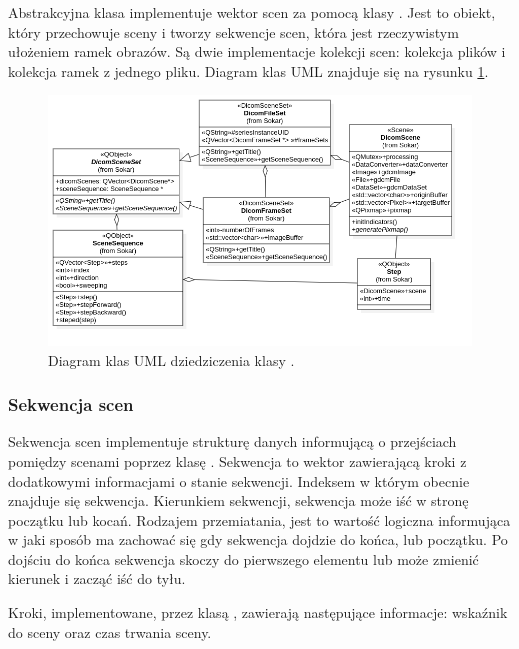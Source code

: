 \label{sec:sokar-scenesets}

Abstrakcyjna klasa  implementuje wektor scen za pomocą klasy .
Jest to obiekt, który przechowuje sceny i tworzy sekwencje scen, która jest rzeczywistym ułożeniem ramek obrazów.
Są dwie implementacje kolekcji scen: kolekcja plików i kolekcja ramek z jednego pliku.
Diagram klas UML znajduje się na rysunku \ref{uml:sokar-scene-sets}.

\begin{figure}[!htbp]
    \centering
    \includegraphics[width=\textwidth]{img/uml/sokar-scene-sets.png}
    \caption{Diagram klas UML dziedziczenia klasy .}
    \label{uml:sokar-scene-sets}
\end{figure}

\subsubsection{Sekwencja scen}
\label{sec:sokar-scenesequence}

\par
Sekwencja scen implementuje strukturę danych informującą o przejściach pomiędzy scenami poprzez klasę .
Sekwencja to wektor zawierającą kroki z dodatkowymi informacjami o stanie sekwencji.
Indeksem w którym obecnie znajduje się sekwencja.
Kierunkiem sekwencji, sekwencja może iść w stronę początku lub kocań.
Rodzajem przemiatania, jest to wartość logiczna informująca w jaki sposób ma zachować się gdy sekwencja dojdzie do końca, lub początku.
Po dojściu do końca sekwencja skoczy do pierwszego elementu lub może zmienić kierunek i zacząć iść do tyłu.

\par
Kroki, implementowane, przez klasą , zawierają następujące informacje: wskaźnik do sceny oraz czas trwania sceny.

